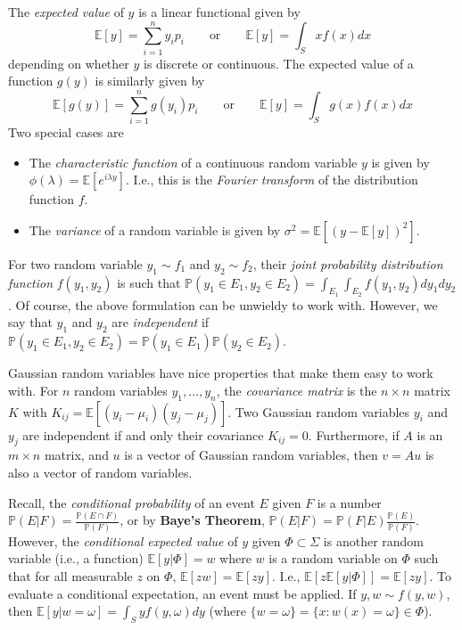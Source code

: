 \documentclass[12pt]{article}
\begin{document}
The {\it expected value} of $y$ is a linear functional given by
$$
\mathbb{E}[y] = \sum_{i=1}^n y_ip_i \qquad\text{or}\qquad 
\mathbb{E}[y] = \int_S x f(x) dx
$$
depending on whether $y$ is discrete or continuous.
The expected value of a function $g(y)$ is similarly given by
$$
\mathbb{E}[g(y)] = \sum_{i=1}^n g(y_i)p_i \qquad\text{or}\qquad 
\mathbb{E}[y] = \int_S g(x) f(x) dx
$$
Two special cases are
\begin{itemize}
\item The {\it characteristic function} of a continuous random variable
$y$ is given by $\phi(\lambda) = \mathbb{E}\left[e^{i\lambda y}\right]$.
I.e., this is the {\it Fourier transform} of the distribution function
$f$.
\item The {\it variance} of a random variable is given by
$\sigma^2 = \mathbb{E}\left[(y - \mathbb{E}[y])^2\right]$.
\end{itemize}

For two random variable $y_1\sim f_1$ and $y_2\sim f_2$, their
{\it joint probability distribution function} $f(y_1, y_2)$
is such that
$\mathbb{P}(y_1\in E_1,y_2\in E_2)=\int_{E_1}\int_{E_2}f(y_1,y_2)dy_1 dy_2$.
Of course, the above formulation can be unwieldy to work with.
However, we say that $y_1$ and $y_2$ are {\it independent} if
$\mathbb{P}(y_1\in E_1,y_2\in E_2)=\mathbb{P}(y_1\in E_1)\mathbb{P}(y_2\in E_2)$.

Gaussian random variables have nice properties that make them easy to work
with.
For $n$ random variables $y_1,\ldots,y_n$, the {\it covariance matrix} is the
$n\times n$ matrix $K$ with
$K_{ij} = \mathbb{E}\left[(y_i - \mu_i)(y_j - \mu_j)\right]$.
Two Gaussian random variables $y_i$ and $y_j$ are independent if and only
their covariance $K_{ij} = 0$.
Furthermore, if $A$ is an $m\times n$ matrix, and $u$ is a vector of 
Gaussian random variables, then $v = Au$ is also a vector of random variables.

Recall, the {\it conditional probability} of an event $E$ given $F$ is a
number $\mathbb{P}(E | F) = \frac{\mathbb{P}(E \cap F)}{\mathbb{P}(F)}$,
or by {\bf Baye's Theorem},
$\mathbb{P}(E | F) = \mathbb{P}(F | E) \frac{\mathbb{P}(E)}{\mathbb{P}(F)}$.
However, the {\it conditional expected value} of $y$ given
$\Phi\subset \Sigma$ is another random variable (i.e., a function)
$\mathbb{E}[y | \Phi] = w$
where $w$ is a random variable on $\Phi$ such that for all
measurable $z$ on $\Phi$, $\mathbb{E}[zw] = \mathbb{E}[zy]$.
I.e.,
$\mathbb{E}\left[ z \mathbb{E}\left[y | \Phi\right] \right] = \mathbb{E}[zy]$.
To evaluate a conditional expectation, an event must be applied.
If $y,w \sim f(y,w)$, then $\mathbb{E}[y|w=\omega] = \int_S y f(y, \omega) dy$
(where $\{w = \omega\} = \{x : w(x)=\omega\} \in \Phi$).
\end{document}
